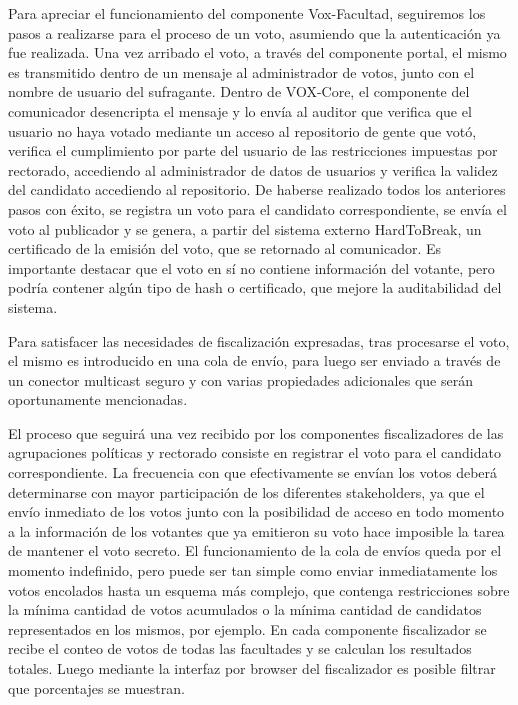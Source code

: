 Para apreciar el funcionamiento del componente Vox-Facultad, seguiremos los pasos a realizarse para el proceso de un voto, asumiendo que la autenticación ya fue realizada. Una vez arribado el voto, a través del componente portal, el mismo es transmitido dentro de un mensaje al administrador de votos, junto con el nombre de usuario del sufragante. Dentro de VOX-Core, el componente del comunicador desencripta el mensaje y lo envía al auditor que verifica que el usuario no haya votado mediante un acceso al repositorio de gente que votó, verifica el cumplimiento por parte del usuario de las restricciones impuestas por rectorado, accediendo al administrador de datos de usuarios %
y verifica la validez del candidato accediendo al repositorio. %
De haberse realizado todos los anteriores pasos con éxito, se registra un voto para el candidato correspondiente, se envía el voto al publicador y se genera, a partir del sistema externo HardToBreak, un certificado de la emisión del voto, que se retornado al comunicador. Es importante destacar que el voto en sí no contiene información del votante, pero podría contener algún tipo de hash o certificado, que mejore la auditabilidad del sistema. 
 
Para satisfacer las necesidades de fiscalización expresadas, tras procesarse el voto, el mismo es introducido en una cola de envío, %
para luego ser enviado a través de un conector multicast seguro y con varias propiedades adicionales que serán oportunamente mencionadas.

El proceso que seguirá una vez recibido por los componentes fiscalizadores de las agrupaciones políticas y rectorado consiste en registrar el voto para el candidato correspondiente. La frecuencia con que efectivamente se envían los votos deberá determinarse con mayor participación de los diferentes stakeholders, ya que el envío inmediato de los votos junto con la posibilidad de acceso en todo momento a la información de los votantes que ya emitieron su voto hace imposible la tarea de mantener el voto secreto. El funcionamiento de la cola de envíos queda por el momento indefinido, pero puede ser tan simple como enviar inmediatamente los votos encolados hasta un esquema más complejo, que contenga restricciones sobre la mínima cantidad de votos acumulados o la mínima cantidad de candidatos representados en los mismos, por ejemplo.
En cada componente fiscalizador se recibe el conteo de votos de todas las facultades y se calculan los resultados totales. Luego mediante la interfaz por browser del fiscalizador es posible filtrar que porcentajes se muestran.

